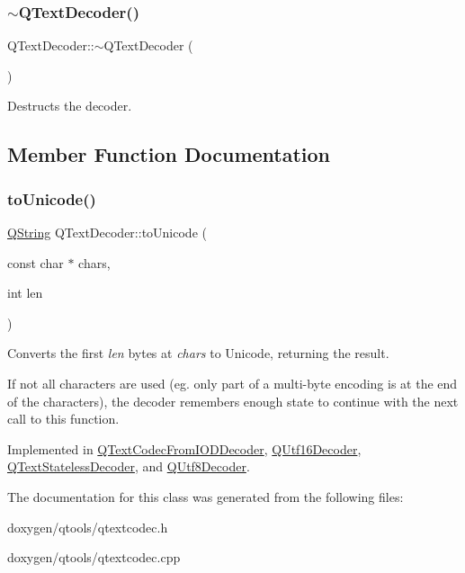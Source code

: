 \subsubsection{\texorpdfstring{$\sim$QTextDecoder()}{~QTextDecoder()}}
{\footnotesize\ttfamily Q\+Text\+Decoder\+::$\sim$\+Q\+Text\+Decoder (\begin{DoxyParamCaption}{ }\end{DoxyParamCaption})\hspace{0.3cm}{\ttfamily [virtual]}}

Destructs the decoder. 

\subsection{Member Function Documentation}
\mbox{\label{class_q_text_decoder_aec543f7f6670dfda14164268e2da879d}} 
\subsubsection{\texorpdfstring{toUnicode()}{toUnicode()}}
{\footnotesize\ttfamily \mbox{\hyperlink{class_q_string}{Q\+String}} Q\+Text\+Decoder\+::to\+Unicode (\begin{DoxyParamCaption}\item[{const char $\ast$}]{chars,  }\item[{int}]{len }\end{DoxyParamCaption})\hspace{0.3cm}{\ttfamily [pure virtual]}}

Converts the first {\itshape len} bytes at {\itshape chars} to Unicode, returning the result.

If not all characters are used (eg. only part of a multi-\/byte encoding is at the end of the characters), the decoder remembers enough state to continue with the next call to this function. 

Implemented in \mbox{\hyperlink{class_q_text_codec_from_i_o_d_decoder_af14a4c0bcf1d9ac1238ef609394d1e18}{Q\+Text\+Codec\+From\+I\+O\+D\+Decoder}}, \mbox{\hyperlink{class_q_utf16_decoder_aa341683deb31e2670a369ee26058f6c4}{Q\+Utf16\+Decoder}}, \mbox{\hyperlink{class_q_text_stateless_decoder_a4f9dcd7c88b39b8e56b87ce9e6d7fd44}{Q\+Text\+Stateless\+Decoder}}, and \mbox{\hyperlink{class_q_utf8_decoder_a8e58c9ca286bd2285123d2bbc1489ae3}{Q\+Utf8\+Decoder}}.



The documentation for this class was generated from the following files\+:\begin{DoxyCompactItemize}
\item 
doxygen/qtools/qtextcodec.\+h\item 
doxygen/qtools/qtextcodec.\+cpp\end{DoxyCompactItemize}
